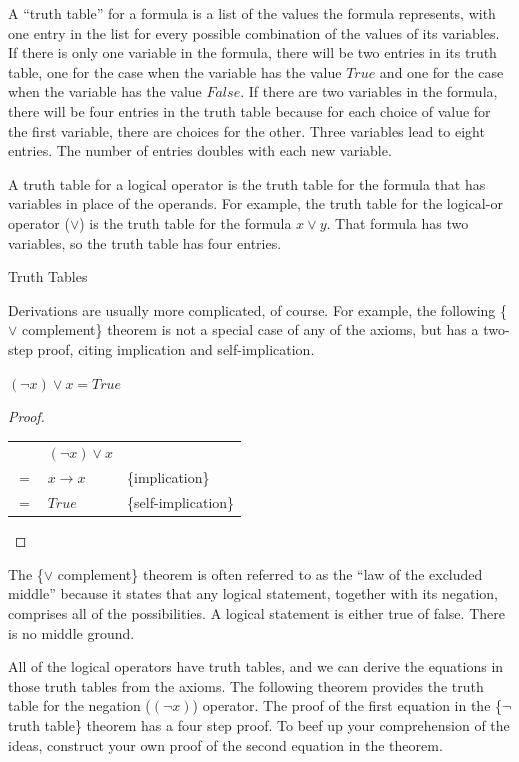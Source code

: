 \begin{aside}
A ``truth table'' for a formula is a list of the values the formula represents,
with one entry in the list for every possible combination of the values of its variables.
If there is only one variable in the formula, there will be two entries in its truth table,
one for the case when the variable has the value $True$ and one for the case when the variable has the value $False$.
If there are two variables in the formula,
there will be four entries in the truth table because for each choice of value for the first variable,
there are choices for the other. Three variables lead to eight entries.
The number of entries doubles with each new variable.

A truth table for a logical operator is the truth table for the formula that has variables in place of the operands. For example, the truth table for the logical-or operator ($\vee$) is the truth table for the formula $x \vee y$. That formula has two variables, so the truth table has four entries.
\caption{Truth Tables}
\label{truth-tables}
\end{aside}

Derivations are usually more complicated, of course. For example, the following
\{$\vee$ complement\} theorem is not a special case of any
of the axioms, but has a two-step proof, citing implication
and self-implication.

\begin{theorem}
$(\neg x) \vee x = True$
\end{theorem}
\begin{proof}
\mbox{}\\
\begin{tabular}{lll}
    & $(\neg x) \vee x$ & \\
$=$ & $x \rightarrow x$ & \{implication\} \\
$=$ & $True$            & \{self-implication\} \\
\end{tabular}

\end{proof}

The \{$\vee$ complement\} theorem is often referred to as the
``law of the excluded middle'' because it states that any
logical statement, together with its negation, comprises all
of the possibilities. A logical statement is either true of false.
There is no middle ground.

All of the logical operators have truth tables, and we can derive the equations in those truth tables from the axioms. The following theorem provides the
truth table for the negation ($(\neg x)$) operator. The proof of the first equation in the \{$\neg$ truth table\} theorem has a four step proof.
To beef up your comprehension of the ideas, construct your own proof of the second equation in the theorem.

